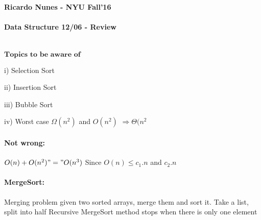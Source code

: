 \documentclass[12pt]{report}
\begin{document}
\paragraph{Ricardo Nunes - NYU Fall'16}
\paragraph{Data Structure 12/06 - Review}\\ 
\(\textbf{Topics to be aware of}\)
 
	\begin{topics}
		\item{i)} Selection Sort
		\item{ii)} Insertion Sort
		\item{iii)} Bubble Sort
		\item{iv)} Worst case \(\Omega(n^2)\) and \(O(n^2)\) \(\Rightarrow \Theta(n^2\)
		
	\end{topics}
	
\paragraph{Not wrong:} \(O(n)+O(n^2) "=" O(n^3)\) Since \(O(n)\leq c_1.n\) and \(c_2.n\)

\paragraph{MergeSort: } Merging problem given two sorted arrays, merge them and sort it.
Take a list, split into half
Recursive MergeSort method stops when there is only one element
\end{document}
